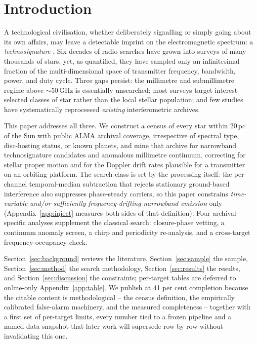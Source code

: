 \documentclass{openjournal}
\begin{document}
\section{Introduction}
\label{sec:intro}

A technological civilisation, whether deliberately signalling or
simply going about its own affairs, may leave a detectable imprint on
the electromagnetic spectrum: a \emph{technosignature}
\citep{Sheikh2020,SETIreview2025}. Six decades of radio searches have
grown into surveys of many thousands of stars, yet, as
\citet{Wright2018} quantified, they have sampled only an infinitesimal
fraction of the multi-dimensional space of transmitter frequency,
bandwidth, power, and duty cycle. Three gaps persist: the
millimetre and submillimetre regime above ${\sim}50$\,GHz is
essentially unsearched; most surveys target interest-selected classes
of star rather than the local stellar population; and few studies have
systematically reprocessed \emph{existing} interferometric archives.

This paper addresses all three. We construct a census of every star
within 20\,pc of the Sun with public ALMA archival coverage,
irrespective of spectral type, disc-hosting status, or known planets,
and mine that archive for narrowband technosignature candidates and
anomalous millimetre continuum, correcting for stellar proper motion
and for the Doppler drift rates plausible for a transmitter on an
orbiting platform. The search class is set by the processing itself:
the per-channel temporal-median subtraction that rejects stationary
ground-based interference also suppresses phase-steady carriers, so
this paper constrains \emph{time-variable and/or sufficiently
frequency-drifting narrowband emission} only
(Appendix~\ref{app:inject} measures both sides of that definition).
Four archival-specific analyses supplement the classical search:
closure-phase vetting, a continuum anomaly screen, a chirp and
periodicity re-analysis, and a cross-target frequency-occupancy check.

Section~\ref{sec:background} reviews the literature,
Section~\ref{sec:sample} the sample, Section~\ref{sec:method} the
search methodology, Section~\ref{sec:results} the results, and
Section~\ref{sec:discussion} the constraints; per-target tables are
deferred to online-only Appendix~\ref{app:table}. We publish at 41 per
cent completion because the citable content is methodological -- the
census definition, the empirically calibrated false-alarm machinery,
and the measured completeness -- together with a first set of
per-target limits, every number tied to a frozen pipeline and a named
data snapshot that later work will supersede row by row without
invalidating this one.
\end{document}
